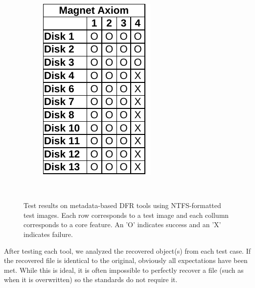\begin{paraphrase}
\begin{figure}
\begin{subfigure}[t]{0.17\linewidth}
        \includegraphics[width=\linewidth]{fig/axiom_results_ntfs.pdf}
    \end{subfigure}~~
        
    \caption{Test results on metadata-based DFR tools using NTFS-formatted test images. Each row corresponds to a test image and each collumn corresponds to a core feature. An 'O' indicates success and an 'X' indicates failure.}
    \label{fig:results_ntfs}
\end{figure}

 After testing each tool, we analyzed the recovered object(s) from each test case. 
If the recovered file is identical to the original, obviously all expectations have been met. 
While this is ideal, it is often impossible to perfectly recover a file (such as when it is overwritten) so the standards do not require it. 


\end{paraphrase}
